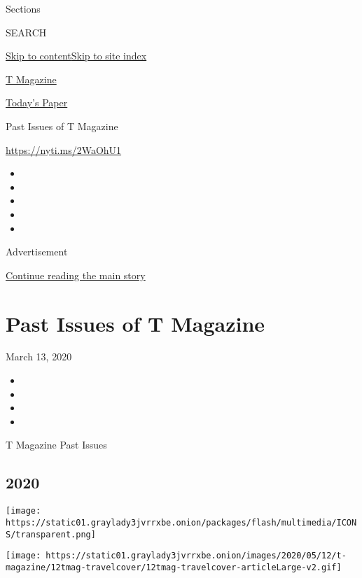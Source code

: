 Sections

SEARCH

\protect\hyperlink{site-content}{Skip to
content}\protect\hyperlink{site-index}{Skip to site index}

\href{https://www.nytimes3xbfgragh.onion/section/t-magazine}{T Magazine}

\href{https://myaccount.nytimes3xbfgragh.onion/auth/login?response_type=cookie\&client_id=vi}{}

\href{https://www.nytimes3xbfgragh.onion/section/todayspaper}{Today's
Paper}

Past Issues of T Magazine

\url{https://nyti.ms/2WaOhU1}

\begin{itemize}
\item
\item
\item
\item
\item
\end{itemize}

Advertisement

\protect\hyperlink{after-top}{Continue reading the main story}

\hypertarget{past-issues-of-t-magazine}{%
\section{Past Issues of T Magazine}\label{past-issues-of-t-magazine}}

March 13, 2020

\begin{itemize}
\item
\item
\item
\item
\end{itemize}

T Magazine Past Issues

\hypertarget{2020}{%
\subsection{2020}\label{2020}}

\href{https://www.nytimes3xbfgragh.onion/issue/t-magazine/2020/05/02/ts-may-17-travel-issue}{}

\texttt{[image: https://static01.graylady3jvrrxbe.onion/packages/flash/multimedia/ICONS/transparent.png]}

\texttt{[image: https://static01.graylady3jvrrxbe.onion/images/2020/05/12/t-magazine/12tmag-travelcover/12tmag-travelcover-articleLarge-v2.gif]}

